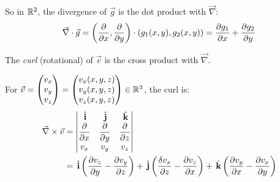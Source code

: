 \documentclass[10pt]{scrartcl}
\begin{document}
So in $\mathbb{R}^2$, the divergence of $\vec{g}$ is the dot product with $\vec{\nabla}$:
\[\vec{\nabla}\cdot\vec{g} = \left(\frac{\partial}{\partial x}, \frac{\partial}{\partial y}\right) \cdot(g_1(x,y),g_2(x,y)) = \frac{\partial g_1}{\partial x} + \frac{\partial g_2}{\partial y}\]

\begin{definition}
The \emph{curl} (rotational) of $\vec{v}$ is the cross product with $\vec{\nabla}$. 
	
For $\vec{v} = \begin{pmatrix}
 v_x \\ v_y \\ v_z	
 \end{pmatrix}
 = \begin{pmatrix}
 v_x(x,y,z)\\ v_y(x,y,z) \\ v_z(x,y,z)	
 \end{pmatrix}
 \in\mathbb{R}^3$, the curl is:\\
 
\[\begin{aligned}
\vec{\nabla} \times \vec{v} &= \begin{vmatrix}
 \hat{i} & \hat{j} & \hat{k}\\
 \dfrac{\del}{\del x} & \dfrac{\del}{\del y} & \dfrac{\del}{\del z}\\
 v_x & v_y & v_z
 \end{vmatrix}\\
	&= \hat{i}\left(\frac{\del v_z}{\del y} - \frac{\del v_y}{\del z}\right)
	+ \hat{j}\left(\frac{\delta v_x}{\del z} - \frac{\del v_z}{\del x}\right)
	+ \hat{k}\left(\frac{\del v_y}{\del x} - \frac{\del v_x}{\del y}\right)
\end{aligned}
\]
\end{definition}~
\end{document}
